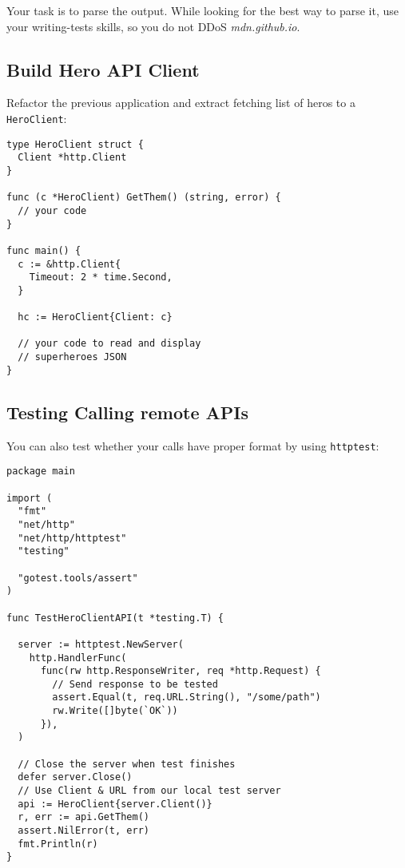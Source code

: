 \documentclass[11pt, letterpaper]{article}
\begin{document}
Your task is to parse the output. While looking for the best way to parse it, use your writing-tests skills,
so you do not {\small DD}o{\small S} \emph{mdn.github.io}.

\subsection{Build Hero {\small API} Client}

Refactor the previous application and extract fetching list of heros to a \verb|HeroClient|:

\begin{verbatim}
type HeroClient struct {
  Client *http.Client
}

func (c *HeroClient) GetThem() (string, error) {
  // your code
}

func main() {
  c := &http.Client{
    Timeout: 2 * time.Second,
  }

  hc := HeroClient{Client: c}
  
  // your code to read and display 
  // superheroes JSON
}
\end{verbatim}

\subsection{Testing Calling remote {\small API}s}

You can also test whether your calls have proper format by using \texttt{httptest}:

\begin{verbatim}
package main

import (
  "fmt"
  "net/http"
  "net/http/httptest"
  "testing"

  "gotest.tools/assert"
)

func TestHeroClientAPI(t *testing.T) {

  server := httptest.NewServer(
    http.HandlerFunc(
      func(rw http.ResponseWriter, req *http.Request) {
        // Send response to be tested
        assert.Equal(t, req.URL.String(), "/some/path") 
        rw.Write([]byte(`OK`))
      }),
  )

  // Close the server when test finishes
  defer server.Close()
  // Use Client & URL from our local test server
  api := HeroClient{server.Client()}
  r, err := api.GetThem()
  assert.NilError(t, err)
  fmt.Println(r)
}
\end{verbatim}
\end{document}
